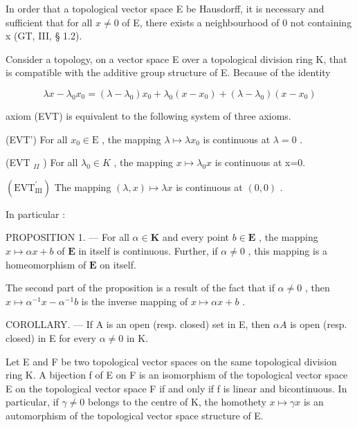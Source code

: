 In order that a topological vector space E be Hausdorff, it is necessary and sufficient that for all \(x \neq 0\) of E, there exists a neighbourhood of 0 not containing x (GT, III, § 1.2).

Consider a topology, on a vector space E over a topological division ring K, that is compatible with the additive group structure of E. Because of the identity

\[
\lambda x - \lambda_ {0} x _ {0} = (\lambda - \lambda_ {0}) x _ {0} + \lambda_ {0} (x - x _ {0}) + (\lambda - \lambda_ {0}) (x - x _ {0})
\]

axiom (EVT) is equivalent to the following system of three axioms.

(EVT') For all \(x_0 \in \mathrm{E}\) , the mapping \(\lambda \mapsto \lambda x_0\) is continuous at \(\lambda = 0\) .

(EVT \(_{II}\) ) For all \(\lambda_{0}\in K\) , the mapping \(x\mapsto\lambda_{0}x\) is continuous at x=0.

\((\mathrm{EVT}_{\mathrm{III}}^{\prime})\) The mapping \((\lambda, x) \mapsto \lambda x\) is continuous at \((0, 0)\) .

In particular :

PROPOSITION 1. --- For all \(\alpha \in \mathbf{K}\) and every point \(b \in \mathbf{E}\) , the mapping \(x \mapsto \alpha x + b\) of \(\mathbf{E}\) in itself is continuous. Further, if \(\alpha \neq 0\) , this mapping is a homeomorphism of \(\mathbf{E}\) on itself.

The second part of the proposition is a result of the fact that if \(\alpha \neq 0\) , then \(x \mapsto \alpha^{-1}x - \alpha^{-1}b\) is the inverse mapping of \(x \mapsto \alpha x + b\) .

COROLLARY. --- If A is an open (resp. closed) set in E, then \(\alpha A\) is open (resp. closed) in E for every \(\alpha \neq 0\) in K.

Let E and F be two topological vector spaces on the same topological division ring K. A bijection f of E on F is an isomorphism of the topological vector space E on the topological vector space F if and only if f is linear and bicontinuous. In particular, if \(\gamma \neq 0\) belongs to the centre of K, the homothety \(x \mapsto \gamma x\) is an automorphism of the topological vector space structure of E.

